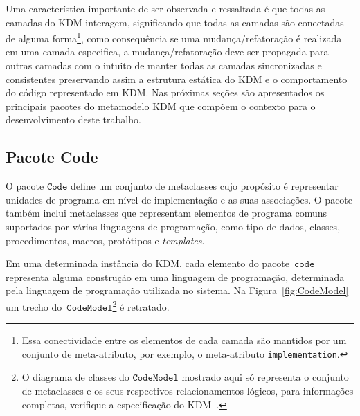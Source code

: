 Uma característica importante de ser observada e ressaltada é que todas as camadas do KDM interagem, significando que todas as camadas são conectadas de alguma forma\footnote{Essa conectividade entre os elementos de cada camada são mantidos por um conjunto de meta-atributo, por exemplo, o meta-atributo \texttt{implementation}.}, como consequência se uma mudança/refatoração é realizada em uma camada especifica, a mudança/refatoração deve ser propagada para outras camadas com o intuito de manter todas as camadas sincronizadas e consistentes preservando assim a estrutura estática do KDM e o comportamento do código representado em KDM. Nas próximas seções são apresentados os principais pacotes do metamodelo KDM que compõem o contexto para o desenvolvimento deste trabalho.

\subsection{Pacote Code}\label{subsection:codePackage}

O pacote $\mathtt{Code}$ define um conjunto de metaclasses cujo propósito é representar unidades de programa em nível de implementação e as suas associações. O pacote também inclui metaclasses que representam elementos de programa comuns suportados por várias linguagens de programação, como tipo de dados, classes, procedimentos, macros, protótipos e \textit{templates}.


Em uma determinada instância do KDM, cada elemento do pacote~$\mathtt{code}$ representa alguma construção em uma linguagem de programação, determinada pela linguagem de programação utilizada no sistema. Na Figura~\ref{fig:CodeModel} um trecho do~$\mathtt{CodeModel}$\footnote{O diagrama de classes do $\mathtt{CodeModel}$ mostrado aqui só representa o conjunto de metaclasses e os seus respectivos relacionamentos lógicos, para informações completas, verifique a especificação do KDM~\cite{KDM:specification}.} é retratado.


